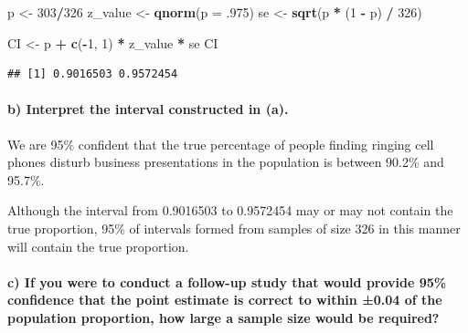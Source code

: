\documentclass[]{article}
\newenvironment{Shaded}{\begin{snugshade}}{\end{snugshade}}
\newcommand{\KeywordTok}[1]{\textcolor[rgb]{0.13,0.29,0.53}{\textbf{#1}}}
\newcommand{\DataTypeTok}[1]{\textcolor[rgb]{0.13,0.29,0.53}{#1}}
\newcommand{\DecValTok}[1]{\textcolor[rgb]{0.00,0.00,0.81}{#1}}
\newcommand{\StringTok}[1]{\textcolor[rgb]{0.31,0.60,0.02}{#1}}
\newcommand{\OperatorTok}[1]{\textcolor[rgb]{0.81,0.36,0.00}{\textbf{#1}}}
\newcommand{\NormalTok}[1]{#1}
\let\oldparagraph\paragraph
\renewcommand{\paragraph}[1]{\oldparagraph{#1}\mbox{}}
\begin{document}
\begin{Shaded}
\begin{Highlighting}[]
\NormalTok{p <-}\StringTok{ }\DecValTok{303}\OperatorTok{/}\DecValTok{326}
\NormalTok{z_value <-}\StringTok{ }\KeywordTok{qnorm}\NormalTok{(}\DataTypeTok{p =}\NormalTok{ .}\DecValTok{975}\NormalTok{)}
\NormalTok{se <-}\StringTok{ }\KeywordTok{sqrt}\NormalTok{(p }\OperatorTok{*}\StringTok{ }\NormalTok{(}\DecValTok{1} \OperatorTok{-}\StringTok{ }\NormalTok{p) }\OperatorTok{/}\StringTok{ }\DecValTok{326}\NormalTok{)}

\NormalTok{CI <-}\StringTok{ }\NormalTok{p }\OperatorTok{+}\StringTok{ }\KeywordTok{c}\NormalTok{(}\OperatorTok{-}\DecValTok{1}\NormalTok{, }\DecValTok{1}\NormalTok{) }\OperatorTok{*}\StringTok{ }\NormalTok{z_value }\OperatorTok{*}\StringTok{ }\NormalTok{se}
\NormalTok{CI}
\end{Highlighting}
\end{Shaded}

\begin{verbatim}
## [1] 0.9016503 0.9572454
\end{verbatim}

\paragraph{b) Interpret the interval constructed in
(a).}\label{b-interpret-the-interval-constructed-in-a.}

We are 95\% confident that the true percentage of people finding ringing
cell phones disturb business presentations in the population is between
90.2\% and 95.7\%.

Although the interval from 0.9016503 to 0.9572454 may or may not contain
the true proportion, 95\% of intervals formed from samples of size 326
in this manner will contain the true proportion.

\paragraph{c) If you were to conduct a follow-up study that would
provide 95\% confidence that the point estimate is correct to within
±0.04 of the population proportion, how large a sample size would be
required?}\label{c-if-you-were-to-conduct-a-follow-up-study-that-would-provide-95-confidence-that-the-point-estimate-is-correct-to-within-0.04-of-the-population-proportion-how-large-a-sample-size-would-be-required}
\end{document}
